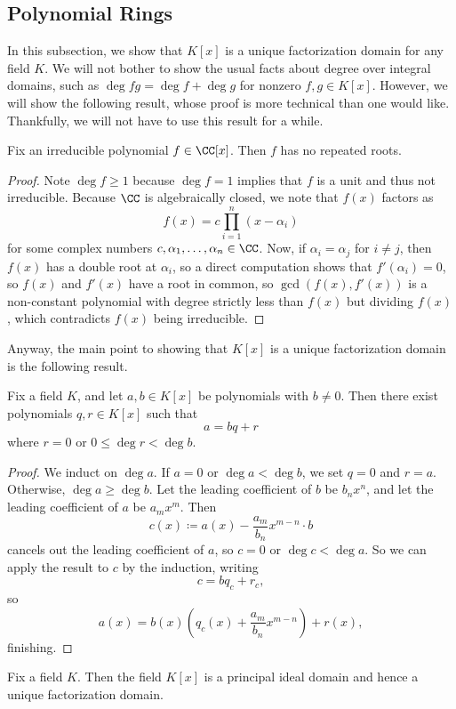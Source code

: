 \documentclass[../notes.tex]{subfiles}
\begin{document}
\subsection{Polynomial Rings}
In this subsection, we show that $K[x]$ is a unique factorization domain for any field $K$. We will not bother to show the usual facts about degree over integral domains, such as $\deg fg=\deg f+\deg g$ for nonzero $f,g\in K[x]$. However, we will show the following result, whose proof is more technical than one would like. Thankfully, we will not have to use this result for a while.
\begin{lemma} \label{lem:c-is-sep}
	Fix an irreducible polynomial $f\in\CC[x]$. Then $f$ has no repeated roots.
\end{lemma}
\begin{proof}
	Note $\deg f\ge1$ because $\deg f=1$ implies that $f$ is a unit and thus not irreducible. Because $\CC$ is algebraically closed, we note that $f(x)$ factors as
	\[f(x)=c\prod_{i=1}^n(x-\alpha_i)\]
	for some complex numbers $c,\alpha_1,\ldots,\alpha_n\in\CC$. Now, if $\alpha_i=\alpha_j$ for $i\ne j$, then $f(x)$ has a double root at $\alpha_i$, so a direct computation shows that $f'(\alpha_i)=0$, so $f(x)$ and $f'(x)$ have a root in common, so $\gcd(f(x),f'(x))$ is a non-constant polynomial with degree strictly less than $f(x)$ but dividing $f(x)$, which contradicts $f(x)$ being irreducible.
\end{proof}
Anyway, the main point to showing that $K[x]$ is a unique factorization domain is the following result.
\begin{proposition}[division] \label{prop:division-for-poly}
	Fix a field $K$, and let $a,b\in K[x]$ be polynomials with $b\ne0$. Then there exist polynomials $q,r\in K[x]$ such that
	\[a=bq+r\]
	where $r=0$ or $0\le\deg r<\deg b$.
\end{proposition}
\begin{proof}
	We induct on $\deg a$. If $a=0$ or $\deg a<\deg b$, we set $q=0$ and $r=a$. Otherwise, $\deg a\ge\deg b$. Let the leading coefficient of $b$ be $b_nx^n$, and let the leading coefficient of $a$ be $a_mx^m$. Then
	\[c(x)\coloneqq a(x)-\frac{a_m}{b_n}x^{m-n}\cdot b\]
	cancels out the leading coefficient of $a$, so $c=0$ or $\deg c<\deg a$. So we can apply the result to $c$ by the induction, writing
	\[c=bq_c+r_c,\]
	so
	\[a(x)=b(x)\left(q_c(x)+\frac{a_m}{b_n}x^{m-n}\right)+r(x),\]
	finishing.
\end{proof}
\begin{theorem}
	Fix a field $K$. Then the field $K[x]$ is a principal ideal domain and hence a unique factorization domain.
\end{theorem}
\end{document}
